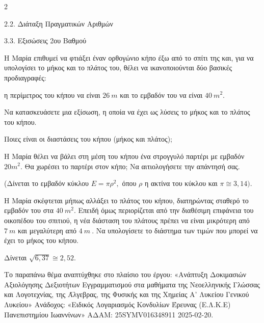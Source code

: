 \begin{ylh}{2}
    \item 2.2. Διάταξη Πραγματικών Αριθμών
    \item 3.3. Εξισώσεις 2ου Βαθμού
\end{ylh}
Η Μαρία επιθυμεί να φτιάξει έναν ορθογώνιο κήπο έξω από το σπίτι της και, για να υπολογίσει το μήκος και το πλάτος του, θέλει να ικανοποιούνται δύο βασικές προδιαγραφές:

η περίμετρος του κήπου να είναι $26\ m$ και το εμβαδόν του να είναι $40{\ m}^{2}$.

\begin{alist}
\item Να κατασκευάσετε μια εξίσωση, η οποία να έχει ως λύσεις το μήκος και το πλάτος του κήπου.
\item Ποιες είναι οι διαστάσεις του κήπου (μήκος και πλάτος);
\item Η Μαρία θέλει να βάλει στη μέση του κήπου ένα στρογγυλό παρτέρι με εμβαδόν $20m^{2}$. Θα χωρέσει το παρτέρι στον κήπο; Να αιτιολογήσετε την απάντησή σας.

(Δίνεται το εμβαδόν κύκλου $E = \pi\rho^{2},$ όπου $\rho$ η ακτίνα του κύκλου και $\pi \cong 3,14)$.
\item Η Μαρία σκέφτεται μήπως αλλάξει το πλάτος του κήπου, διατηρώντας σταθερό το εμβαδόν του στα $40\ m^{2}$. Επειδή όμως περιορίζεται από την διαθέσιμη επιφάνεια του οικοπέδου του σπιτιού, η νέα διάσταση του πλάτους πρέπει να είναι μικρότερη από $7\ m$ και μεγαλύτερη από $4\ m\ .$ Να υπολογίσετε το διάστημα των τιμών που μπορεί να έχει το μήκος του κήπου.

Δίνεται $\sqrt{6,37} \cong 2,52$.

{\footnotesize Το παραπάνω θέμα αναπτύχθηκε στο πλαίσιο του έργου: «Ανάπτυξη Δοκιμασιών Αξιολόγησης Δεξιοτήτων Εγγραμματισμού στα μαθήματα της Νεοελληνικής Γλώσσας και Λογοτεχνίας, της Άλγεβρας, της Φυσικής και της Χημείας Α' Λυκείου Γενικού Λυκείου» Ανάδοχος: «Ειδικός Λογαριασμός Κονδυλίων Έρευνας (Ε.Λ.Κ.Ε) Πανεπιστημίου Ιωαννίνων» ΑΔΑΜ: 25SYMV016348911 2025-02-20.}
\end{alist}

